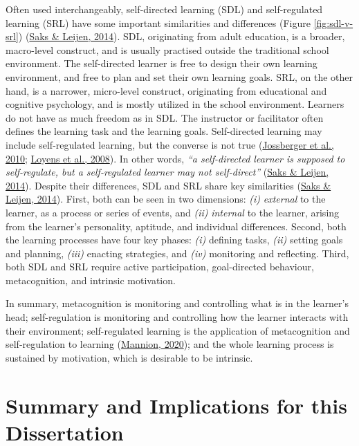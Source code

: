 \documentclass[letterpaper, nobind]{templates/ociamthesis}
\begin{document}
Often used interchangeably, self-directed learning (SDL) and
self-regulated learning (SRL) have some important similarities and
differences (Figure \ref{fig:sdl-v-srl}) (\protect\hyperlink{ref-saks2014distinguishing}{Saks \& Leijen, 2014}). SDL, originating
from adult education, is a broader, macro-level construct, and is
usually practised outside the traditional school environment. The
self-directed learner is free to design their own learning environment,
and free to plan and set their own learning goals. SRL, on the other
hand, is a narrower, micro-level construct, originating from educational
and cognitive psychology, and is mostly utilized in the school
environment. Learners do not have as much freedom as in SDL. The
instructor or facilitator often defines the learning task and the
learning goals. Self-directed learning may include self-regulated
learning, but the converse is not true
(\protect\hyperlink{ref-jossberger2010challenge}{Jossberger et al., 2010}; \protect\hyperlink{ref-loyens2008selfdirected}{Loyens et al., 2008}). In other words, \emph{``a self-directed learner is supposed to self-regulate, but a self-regulated learner may not self-direct''} (\protect\hyperlink{ref-saks2014distinguishing}{Saks \& Leijen, 2014}). Despite their
differences, SDL and SRL share key similarities
(\protect\hyperlink{ref-saks2014distinguishing}{Saks \& Leijen, 2014}).
First, both can be seen in two dimensions:
\emph{(i)} \emph{external} to the learner, as a process or series of events, and
\emph{(ii)} \emph{internal} to the learner, arising from the learner's personality, aptitude, and individual differences.
Second, both the
learning processes have four key phases:
\emph{(i)} defining tasks,
\emph{(ii)} setting goals and planning,
\emph{(iii)} enacting strategies, and
\emph{(iv)} monitoring and reflecting.
Third, both SDL and SRL require active
participation, goal-directed behaviour, metacognition, and intrinsic
motivation.

In summary, metacognition is monitoring and controlling what is in the
learner's head; self-regulation is monitoring and controlling how the
learner interacts with their environment; self-regulated learning is the
application of metacognition and self-regulation to learning
(\protect\hyperlink{ref-mannion2020metacognition}{Mannion, 2020}); and the whole learning process is sustained
by motivation, which is desirable to be intrinsic.

\hypertarget{sec-bg-learn-summary}{%
\section{Summary and Implications for this Dissertation}\label{sec-bg-learn-summary}}
\end{document}
